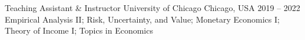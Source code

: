 

\begin{cventries}
	\cventry
	{Teaching Assistant \& Instructor} %
	{University of Chicago} %
	{Chicago, USA} %
	{2019 – 2022} %
	{Empirical Analysis II; Risk, Uncertainty, and Value; Monetary Economics I; Theory of Income I; Topics in Economics}
\end{cventries}
